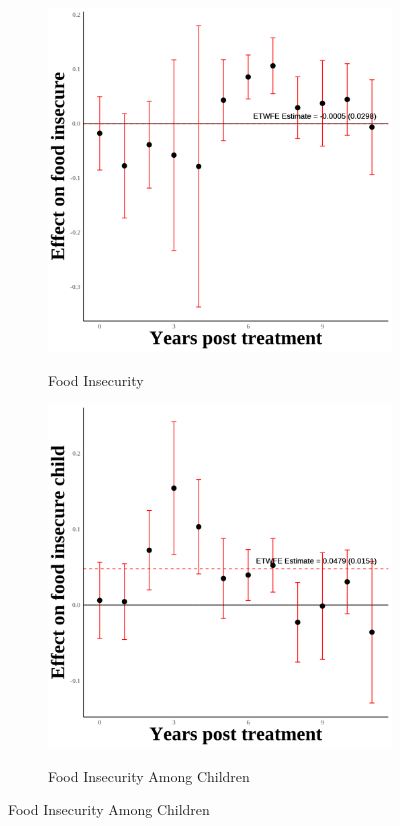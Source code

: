 \documentclass[12pt,english]{article}
\begin{document}
\begin{figure}[H]
  \begin{subfigure}[b]{0.3\textwidth}
    \centering
    \caption{Food Insecurity}
    \includegraphics[width=\linewidth]{figures/plot24-food_insecure_event_study-second.png}
    \label{fig:food-insecure-second}
  \end{subfigure}
  \hfill
  \begin{subfigure}[b]{0.3\textwidth}
    \centering
    \caption{Food Insecurity Among Children}
    \includegraphics[width=\linewidth]{figures/plot25-food_insecure_child_event_study-second.png}
    \label{fig:food-insecure-child-second}
  \end{subfigure}

\end{figure}
\end{document}
